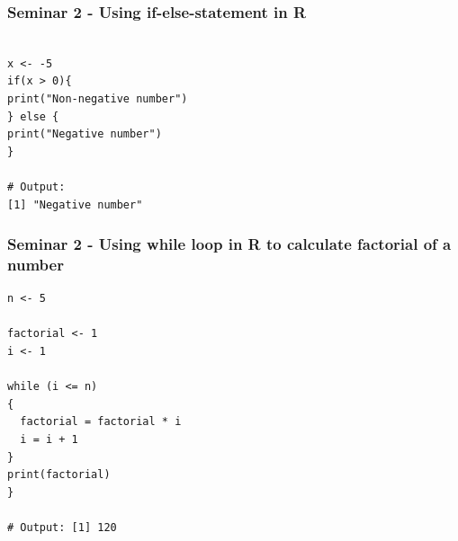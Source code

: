 \documentclass{beamer}
\begin{document}
\begin{frame}[fragile]
\frametitle{Seminar 2 - Using if-else-statement in R}
\begin{example}[1.2]
\begin{verbatim}

x <- -5
if(x > 0){
print("Non-negative number")
} else {
print("Negative number")
}

# Output:
[1] "Negative number"
\end{verbatim}
\end{example}
\end{frame}
\begin{frame}[fragile] 
\frametitle{Seminar 2 - Using while loop in R to calculate factorial of a number}
\begin{example}[1.3]
\begin{verbatim}
n <- 5

factorial <- 1
i <- 1

while (i <= n)
{
  factorial = factorial * i
  i = i + 1
}
print(factorial)
}

# Output: [1] 120
\end{verbatim}
\end{example}
\end{frame}
\end{document}
